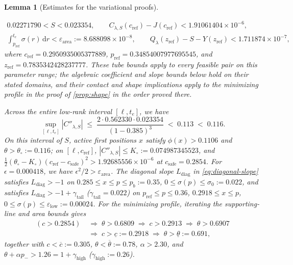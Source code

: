 \documentclass[11pt]{article}
\numberwithin{equation}{section}
\theoremstyle{plain}
\newtheorem{lemma}[theorem]{Lemma}
\theoremstyle{definition}
\newcommand{\1}{\mathbf{1}}
\begin{document}
\begin{lemma}[Estimates for the variational proofs]
\begin{enumerate}[label=(\roman*)]
  \[
    \begin{gathered}
      0.02271790 < S < 0.023354, \qquad C_{\lambda, S}(c_{\mathrm{ref}}) - J(c_{\mathrm{ref}}) < 1.91061404 \times 10^{-6}, \\
      \int_{p_{\mathrm{ref}}}^{t_e} \sigma(r)\,\mathrm{d}r < \varepsilon_{\mathrm{area}} := 8.688098 \times 10^{-8}, \qquad Q_\lambda(z_{\mathrm{ref}}) - S - Y(z_{\mathrm{ref}}) < 1.711874 \times 10^{-7},
    \end{gathered}
  \]
  where $c_{\mathrm{ref}} = 0.2950935005377889$, $p_{\mathrm{ref}} = 0.34854007977695545$, and $z_{\mathrm{ref}} = 0.7835342428237777$. These tube bounds apply to every feasible pair on this parameter range; the algebraic coefficient and slope bounds below hold on their stated domains, and their contact and shape implications apply to the minimizing profile in the proof of \cref{prop:shape} in the order proved there.

  Across the entire low-rank interval $[\ell, t_e]$, we have
  \[
    \sup_{[\ell, t_e]} |C''_{\lambda, S}| \;\le\; \frac{2 \cdot 0.562330 \cdot 0.023354}{(1 - 0.385)^3} \;<\; 0.113 \;<\; 0.116.
  \]
  On this interval of $S$, active first positions $x$ satisfy $\phi(x) > 0.1106$ and $\theta > \theta_\circ := 0.116$; on $[\ell, c_{\mathrm{ref}}]$, $|C''_{\lambda, S}| \le K_\circ := 0.074987345523$, and $\frac{1}{2}(\theta_\circ - K_\circ)(c_{\mathrm{ref}} - c_{\mathrm{safe}})^2 > 1.92685556 \times 10^{-6}$ at $c_{\mathrm{safe}} = 0.2854$. For $\epsilon = 0.000418$, we have $\epsilon^2/2 > \varepsilon_{\mathrm{area}}$. The diagonal slope $L_{\mathrm{diag}}$ in \eqref{eq:diagonal-slope} satisfies $L_{\mathrm{diag}} > -1$ on $0.285 \le x \le p \le p_b := 0.35$, $0 \le \sigma(p) \le \sigma_0 := 0.022$, and satisfies $L_{\mathrm{diag}} > -1 + \gamma_{\mathrm{tail}}$ ($\gamma_{\mathrm{tail}} = 0.022$) on $p_{\mathrm{ref}} \le p \le 0.36$, $0.2918 \le x \le p$, $0 \le \sigma(p) \le \varepsilon_{\mathrm{low}} := 0.00024$. For the minimizing profile, iterating the supporting-line and area bounds gives
  \[
    \begin{aligned}
      (c > 0.2854) &\;\Rightarrow\; \theta > 0.6809 \;\Rightarrow\; c > 0.2913 \;\Rightarrow\; \theta > 0.6907 \\
      &\;\Rightarrow\; c > \underline{c} := 0.2918 \;\Rightarrow\; \theta > \underline{\theta} := 0.691,
    \end{aligned}
  \]
  together with $c < \overline{c} := 0.305$, $\theta < \overline{\theta} := 0.78$, $\alpha > 2.30$, and $\theta + \alpha p_- > 1.26 = 1 + \gamma_{\mathrm{high}}$ ($\gamma_{\mathrm{high}} := 0.26$).
\end{enumerate}
\end{lemma}
\end{document}
